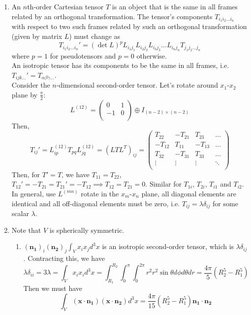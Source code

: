 \documentclass[a4paper]{article}
\begin{document}
\begin{ans}\leavevmode
\begin{enumerate}[label=(\alph*)]
\item An $n$th-order Cartesian tensor $T$ is an object that is the same in all frames related by an orthogonal transformation. The tensor's components $T_{i_1i_2...i_n}$ with respect to two such frames related by such an orthogonal transformation (given by matrix $L$) must change as 
$$T_{i_1i_2...i_n}'=(\det L)^pL_{i_1j_1}L_{i_2j_2}L_{i_3j_3}...L_{i_nj_n}T_{j_1j_2...j_n}$$
where $p=1$ for pseudotensors and $p=0$ otherwise.\\[5pt]
An isotropic tensor has its components to be the same in all frames, i.e. $T_{ijk...}'=T_{\alpha\beta\gamma...}$.\\[5pt]
Consider the $n$-dimensional second-order tensor. Let's rotate around $x_1$-$x_2$ plane by $\frac{\pi}{2}$:
$$L^{(12)}=\begin{pmatrix}0&1\\-1&0\\\end{pmatrix}\oplus I_{(n-2)\times(n-2)}$$
Then, 
$$T_{ij}'=L_{ip}^{(12)}T_{pq}L_{jq}^{(12)}=(LTL^T)_{ij}=\begin{pmatrix}T_{22}&-T_{21}&T_{23}&\dots\\-T_{12}&T_{11}&-T_{13}&\dots\\T_{32}&-T_{31}&T_{33}&\dots\\\vdots&\vdots&\vdots&\ddots\\\end{pmatrix}$$
Then, for $T'=T$, we have $T_{11}=T_{22}$, $T_{12}'=-T_{21}=T_{21}'=-T_{12}\implies T_{12}=T_{21}=0$. Similar for $T_{1i}$, $T_{2i}$, $T_{i1}$ and $T_{i2}$. In general, use $L^{(mn)}$ rotate in the $x_m$-$x_n$ plane, all diagonal elements are identical and all off-diagonal elements must be zero, i.e. $T_{ij}=\lambda\delta_{ij}$ for some scalar $\lambda$.
\item Note that $V$ is spherically symmetric.
\begin{enumerate}[label=(\roman*)]
    \item $(\mathbf{n_1})_i(\mathbf{n_2})_j\int_Vx_ix_jd^3x$ is an isotropic second-order tensor, which is $\lambda\delta_{ij}$. Contracting this, we have
    $$\lambda\delta_{ii}=3\lambda=\int_Vx_ix_id^3x=\int_{R_1}^{R_2}\int_0^\pi\int_0^{2\pi}r^2r^2\sin\theta d\phi d\theta dr=\frac{4\pi}{5}(R_2^5-R_1^5)$$
    Then we must have
    $$\int_V(\mathbf{x}\cdot\mathbf{n_1})(\mathbf{x}\cdot\mathbf{n_2})d^3x=\frac{4\pi}{15}(R_2^5-R_1^5)\mathbf{n_1}\cdot\mathbf{n_2}$$

\end{enumerate}
\end{enumerate}
\end{ans}
\end{document}
